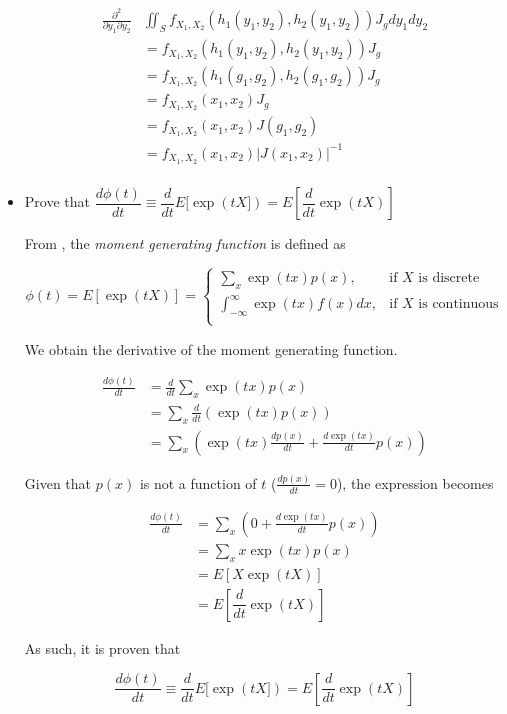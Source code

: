 \documentclass[a4paper,12pt]{article}
\begin{document}
\begin{itemize}
\begin{align*}
 \frac{\partial^2}{\partial y_1 \partial y_2} & \iint_S f_{X_1, X_2} (h_1(y_1, y_2), h_2(y_1, y_2)) J_g dy_1 dy_2 \\
 &= f_{X_1, X_2} (h_1(y_1, y_2), h_2(y_1, y_2)) J_g  \\
 &= f_{X_1, X_2} (h_1(g_1, g_2), h_2(g_1, g_2)) J_g      \\
 &= f_{X_1, X_2} (x_1, x_2) J_g      \\
 &= f_{X_1, X_2} (x_1, x_2) J(g_1, g_2)   \\
 &= f_{X_1, X_2} (x_1, x_2) |J(x_1, x_2)|^{-1} \\
\end{align*}



 \item Prove that $\dfrac{d \phi(t)}{dt} \equiv \dfrac{d}{dt} E[\exp(t X]) = E[\dfrac{d}{dt}  \exp(tX)]$

 From \cite{ross2006introduction}, the \emph{moment generating function} is defined as

 \begin{equation*}
  \phi(t) = E[\exp(tX)] = \begin{cases}
                                    \sum_x \exp(tx) p(x), & \text{if } X \text{ is discrete}\\
                                    \int_{-\infty}^{\infty}\exp(tx)f(x)dx, & \text{if } X \text{ is continuous}\\
                                   \end{cases}
 \end{equation*}

 We obtain the derivative of the moment generating function.

 \begin{align*}
  \frac{d \phi(t)}{dt} &= \frac{d}{dt} \sum_x \exp(tx) p(x)\\
  &= \sum_x \frac{d}{dt} \left (\exp(tx) p(x) \right )\\
  &= \sum_x \left (
  \exp(tx) \frac{dp(x)}{dt}  + \frac{d \exp(tx)}{dt}  p(x)
  \right )
 \end{align*}

 Given that $p(x)$ is not a function of $t$ ($\frac{d p(x)}{dt}= 0$), the expression becomes

 \begin{align*}
  \frac{d \phi(t)}{dt} &= \sum_x \left (
  0  + \frac{d \exp(tx)}{dt}  p(x)
  \right )\\
  &= \sum_x x \exp(tx)  p(x) \\
  &= E[X\exp(tX)]\\
  &= E[\dfrac{d}{dt} \exp(tX)]
 \end{align*}

As such, it is proven that

\begin{equation*}
 \frac{d \phi(t)}{dt} \equiv \frac{d}{dt} E[\exp(t X]) = E[\frac{d}{dt}  \exp(tX)]
\end{equation*}


\end{itemize}


\printbibliography
\end{document}
